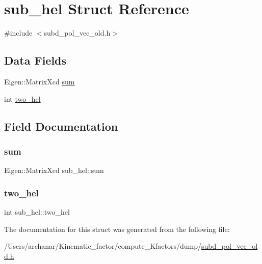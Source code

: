 \hypertarget{structsub__hel}{}\section{sub\+\_\+hel Struct Reference}
\label{structsub__hel}


{\ttfamily \#include $<$subd\+\_\+pol\+\_\+vec\+\_\+old.\+h$>$}

\subsection*{Data Fields}
\begin{DoxyCompactItemize}
\item 
Eigen\+::\+Matrix\+Xcd \mbox{\hyperlink{structsub__hel_ab9af10158d0adb4843c85bdf9b7517f7}{sum}}
\item 
int \mbox{\hyperlink{structsub__hel_a5169b026327848aac58eb2eec0f0cbb1}{two\+\_\+hel}}
\end{DoxyCompactItemize}


\subsection{Field Documentation}
\mbox{\label{structsub__hel_ab9af10158d0adb4843c85bdf9b7517f7}} 
\subsubsection{\texorpdfstring{sum}{sum}}
{\footnotesize\ttfamily Eigen\+::\+Matrix\+Xcd sub\+\_\+hel\+::sum}

\mbox{\label{structsub__hel_a5169b026327848aac58eb2eec0f0cbb1}} 
\subsubsection{\texorpdfstring{two\_hel}{two\_hel}}
{\footnotesize\ttfamily int sub\+\_\+hel\+::two\+\_\+hel}



The documentation for this struct was generated from the following file\+:\begin{DoxyCompactItemize}
\item 
/\+Users/archanar/\+Kinematic\+\_\+factor/compute\+\_\+\+Kfactors/dump/\mbox{\hyperlink{subd__pol__vec__old_8h}{subd\+\_\+pol\+\_\+vec\+\_\+old.\+h}}\end{DoxyCompactItemize}
